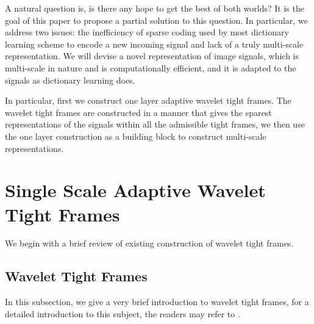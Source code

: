 \documentclass[a4paper]{article}
\begin{document}
A natural question is, is there any hope to get the best of both worlds? It is the goal of this paper to propose a partial solution to this question. In particular, we address two issues: the inefficiency of sparse coding used by most dictionary learning scheme to encode a new incoming signal and lack of a truly multi-scale representation. We will devise a novel representation of image signals, which is multi-scale in nature and is computationally efficient, and it is adapted to the signals as dictionary learning does. 

In particular, first we construct one layer adaptive wavelet tight frames. The wavelet tight frames are constructed in a manner that gives the sparest representations of the signals within all the admissible tight frames, we then use the one layer construction as a building block to construct multi-scale representations.
\section{Single Scale Adaptive Wavelet Tight Frames}
We begin with a brief review of existing construction of wavelet tight frames.

\subsection{Wavelet Tight Frames}
In this subsection, we give a very brief introduction to wavelet tight frames, for a detailed introduction to this subject, the readers may refer to \cite{shen2010wavelet,daubechies2003framelets}.
\end{document}
